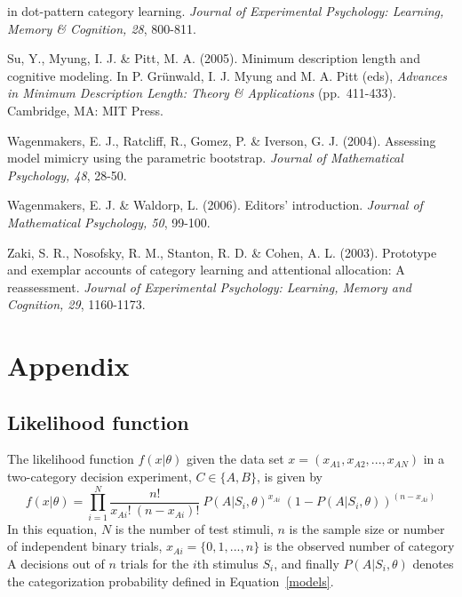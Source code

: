 \documentclass[11pt]{article}
\begin{document}
\begin{list}{}{\setlength{\leftmargin}{10pt}\setlength{\itemindent}{-10pt}\setlength{\parsep}{-1pt}}
in dot-pattern category learning. {\it Journal of Experimental Psychology: Learning, Memory \&
Cognition, 28}, 800-811.
\item Su, Y., Myung, I. J. \& Pitt, M. A. (2005). Minimum description length and cognitive modeling.
In P. Gr\"{u}nwald, I. J. Myung and M. A. Pitt (eds), {\it Advances in Minimum Description Length:
Theory \& Applications} (pp.\ 411-433). Cambridge, MA: MIT Press.
\item Wagenmakers, E. J., Ratcliff, R., Gomez, P. \& Iverson, G. J. (2004). Assessing model mimicry using
the parametric bootstrap. {\it Journal of Mathematical Psychology, 48}, 28-50.
\item Wagenmakers, E. J. \& Waldorp, L. (2006). Editors' introduction. {\it Journal of Mathematical
Psychology, 50}, 99-100.
\item Zaki, S. R., Nosofsky, R. M., Stanton, R. D. \& Cohen, A. L. (2003). Prototype and exemplar accounts
of category learning and attentional allocation: A reassessment. {\it Journal of Experimental
Psychology: Learning, Memory and Cognition, 29}, 1160-1173.
\end{list}\normalsize


\newpage
\section*{Appendix}
\subsection*{Likelihood function}
The likelihood function $f(x|\theta)$ given the data set $x=(x_{A1},x_{A2}, ..., x_{AN}) $ in a
two-category decision experiment, $C \in \{A,B\}$, is given by
\begin{displaymath}
f(x|\theta) = \prod_{i=1}^{N} \frac{n!}{x_{Ai}!\ (n-x_{Ai})!}\ P(A|S_i,\theta)^{x_{Ai}}\
(1-P(A|S_i,\theta))^{(n-x_{Ai})}
\end{displaymath}
In this equation, $N$ is the number of test stimuli, $n$ is the sample size or number of
independent binary trials, $x_{Ai} = \{0,1,...,n \}$ is the observed number of category A
decisions out of $n$ trials for the $i$th stimulus $S_i$, and finally $P(A|S_i,\theta)$ denotes
the categorization probability defined in Equation~\ref{models}.
\end{document}
